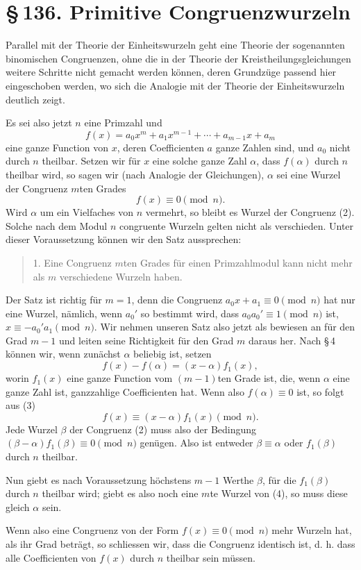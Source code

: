 \documentclass[11pt]{article}
\providecommand{\sect}[2]{\section*{\S\,#1. #2}}
\begin{document}
\sect{136}{Primitive Congruenzwurzeln}

Parallel mit der Theorie der Einheitswurzeln geht eine Theorie der sogenannten binomischen Congruenzen, ohne die in der Theorie der Kreistheilungsgleichungen weitere Schritte nicht gemacht werden können, deren Grundzüge passend hier eingeschoben werden, wo sich die Analogie mit der Theorie der Einheitswurzeln deutlich zeigt.

Es sei also jetzt $n$ eine Primzahl und
\[
\tag{1}        f(x)=a_0x^m+a_1x^{m-1}+\cdots+a_{m-1}x+a_m
\]
eine ganze Function von $x$, deren Coefficienten $a$ ganze Zahlen sind, und $a_0$ nicht durch $n$ theilbar. Setzen wir für $x$ eine solche ganze Zahl $\alpha$, dass $f(\alpha)$ durch $n$ theilbar wird, so sagen wir (nach Analogie der Gleichungen), $\alpha$ sei eine Wurzel der Congruenz $m$ten Grades
\[
\tag{2}        f(x)\equiv0\pmod n.
\]
Wird $\alpha$ um ein Vielfaches von $n$ vermehrt, so bleibt es Wurzel der Congruenz (2). Solche nach dem Modul $n$ congruente Wurzeln gelten nicht als verschieden. Unter dieser Voraussetzung können wir den Satz aussprechen:
\begin{quote}
1. Eine Congruenz $m$ten Grades für einen Primzahlmodul kann nicht mehr als $m$ verschiedene Wurzeln haben.
\end{quote}
Der Satz ist richtig für $m=1$, denn die Congruenz $a_0x+a_1\equiv0\pmod n$ hat nur eine Wurzel, nämlich, wenn $a_0'$ so bestimmt wird, dass $a_0a_0'\equiv1\pmod n$ ist, $x\equiv-a_0'a_1\pmod n$. Wir nehmen unseren Satz also jetzt als bewiesen an für den Grad $m-1$ und leiten seine Richtigkeit für den Grad $m$ daraus her. Nach \S\,4 können wir, wenn zunächst $\alpha$ beliebig ist, setzen
\[
\tag{3}        f(x)-f(\alpha)=(x-\alpha)f_1(x),
\]
worin $f_1(x)$ eine ganze Function vom $(m-1)$ten Grade ist, die, wenn $\alpha$ eine ganze Zahl ist, ganzzahlige Coefficienten hat. Wenn also $f(\alpha)\equiv0$ ist, so folgt aus (3)
\[
\tag{4}        f(x)\equiv(x-\alpha)f_1(x)\pmod n.
\]
Jede Wurzel $\beta$ der Congruenz (2) muss also der Bedingung $(\beta-\alpha)f_1(\beta)\equiv0\pmod n$ genügen. Also ist entweder $\beta\equiv\alpha$ oder $f_1(\beta)$ durch $n$ theilbar.

Nun giebt es nach Voraussetzung höchstens $m-1$ Werthe $\beta$, für die $f_1(\beta)$ durch $n$ theilbar wird; giebt es also noch eine $m$te Wurzel von (4), so muss diese gleich $\alpha$ sein.

Wenn also eine Congruenz von der Form $f(x)\equiv0\pmod n$ mehr Wurzeln hat, als ihr Grad beträgt, so schliessen wir, dass die Congruenz identisch ist, d. h. dass alle Coefficienten von $f(x)$ durch $n$ theilbar sein müssen.
\end{document}
